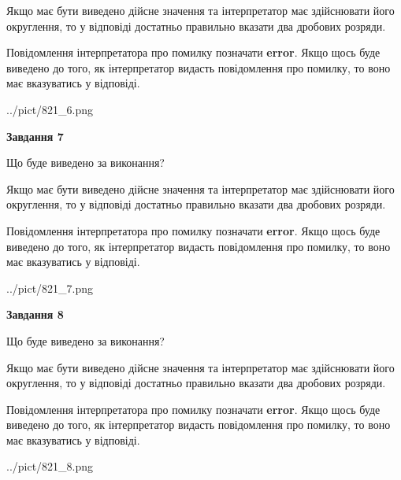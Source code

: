 \documentclass[12pt, ukrainian]{article}
\begin{document}
{\begin {Large}
Якщо має бути виведено дійсне значення та інтерпретатор має здійснювати його округлення, 
то у відповіді достатньо правильно вказати два дробових розряди.

Повідомлення інтерпретатора про помилку позначати \textbf{error}.
Якщо щось буде виведено до того, як інтерпретатор видасть повідомлення про помилку, 
то воно має вказуватись у відповіді. \par

\begin{center}
	{../pict/821_6.png}
\end{center}
\newpage

{\begin {center}\textbf{Завдання 7}\end {center}}\par
Що буде виведено за виконання? \par

Якщо має бути виведено дійсне значення та інтерпретатор має здійснювати його округлення, 
то у відповіді достатньо правильно вказати два дробових розряди.

Повідомлення інтерпретатора про помилку позначати \textbf{error}.
Якщо щось буде виведено до того, як інтерпретатор видасть повідомлення про помилку, 
то воно має вказуватись у відповіді. \par

\begin{center}
	{../pict/821_7.png}
\end{center}
\newpage

{\begin {center}\textbf{Завдання 8}\end {center}}\par
Що буде виведено за виконання? \par

Якщо має бути виведено дійсне значення та інтерпретатор має здійснювати його округлення, 
то у відповіді достатньо правильно вказати два дробових розряди.

Повідомлення інтерпретатора про помилку позначати \textbf{error}.
Якщо щось буде виведено до того, як інтерпретатор видасть повідомлення про помилку, 
то воно має вказуватись у відповіді. \par

\begin{center}
	{../pict/821_8.png}
\end{center}
\newpage


\end{Large}}
\end{document}
